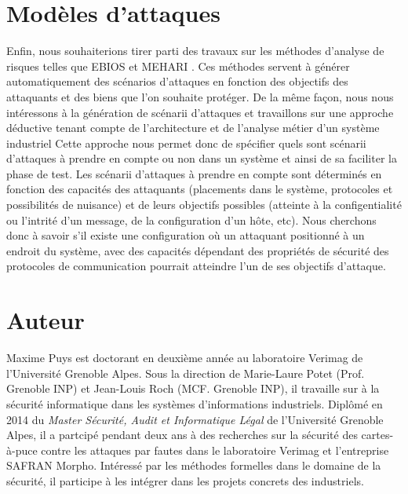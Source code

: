 \documentclass{article}
\begin{document}
\section{Modèles d'attaques}

Enfin, nous souhaiterions tirer parti des travaux sur les méthodes d'analyse
de risques telles que EBIOS \cite{EBIOS} et MEHARI \cite{MEHARI}.
Ces méthodes servent à générer automatiquement des scénarios d'attaques en
fonction des objectifs des attaquants et des biens que l'on souhaite protéger.
De la même façon, nous nous intéressons à la génération de scénarii d'attaques
et travaillons sur une approche déductive tenant compte de l’architecture et de
l’analyse métier d’un système industriel
Cette approche nous permet donc de spécifier quels sont scénarii d’attaques à
prendre en compte ou non dans un système et ainsi de sa  faciliter la phase de
test.
Les scénarii d’attaques à prendre en compte sont déterminés en fonction des
capacités des attaquants (placements dans le système, protocoles et possibilités
de nuisance) et de leurs objectifs possibles (atteinte à la configentialité ou 
l'intrité d'un message, de la configuration d'un hôte, etc).
Nous cherchons donc à savoir s'il existe une configuration où un attaquant
positionné à un endroit du système, avec des capacités dépendant des propriétés
de sécurité des protocoles de communication pourrait atteindre l'un de ses
objectifs d'attaque.

\section{Auteur}

Maxime Puys est doctorant en deuxième année au laboratoire Verimag de
l'Université Grenoble Alpes.
Sous la direction de Marie-Laure Potet (Prof. Grenoble INP) et Jean-Louis Roch
(MCF. Grenoble INP), il travaille sur à la sécurité informatique dans les
systèmes d'informations industriels.
Diplômé en 2014 du {\em Master Sécurité, Audit et Informatique Légal} de
l'Université Grenoble Alpes, il a partcipé pendant deux ans à des recherches sur
la sécurité des cartes-à-puce contre les attaques par fautes dans le laboratoire
Verimag et l'entreprise SAFRAN Morpho.
Intéressé par les méthodes formelles dans le domaine de la sécurité, il
participe à les intégrer dans les projets concrets des industriels.



\end{document}
